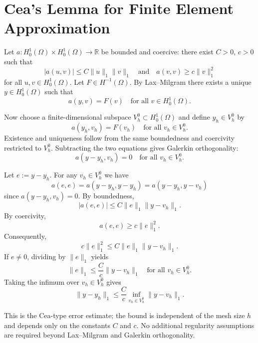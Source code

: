 \documentclass{article}
\begin{document}
\section*{Cea’s Lemma for Finite Element Approximation}

Let $a: H^1_0(\Omega) \times H^1_0(\Omega) \to \mathbb{R}$ be bounded and coercive: there exist $C>0$, $c>0$ such that
\[
|a(u,v)| \le C \|u\|_1 \|v\|_1
\quad \text{and} \quad
a(v,v) \ge c \|v\|_1^2
\]
for all $u,v \in H^1_0(\Omega)$. Let $F \in H^{-1}(\Omega)$. By Lax--Milgram there exists a unique $y \in H^1_0(\Omega)$ such that
\[
a(y,v) = F(v) \quad \text{for all } v \in H^1_0(\Omega).
\]

Now choose a finite-dimensional subspace $V_h^0 \subset H^1_0(\Omega)$ and define $y_h \in V_h^0$ by
\[
a(y_h,v_h) = F(v_h) \quad \text{for all } v_h \in V_h^0.
\]
Existence and uniqueness follow from the same boundedness and coercivity restricted to $V_h^0$. Subtracting the two equations gives Galerkin orthogonality:
\[
a(y - y_h, v_h) = 0 \quad \text{for all } v_h \in V_h^0.
\]

Let $e := y - y_h$. For any $v_h \in V_h^0$ we have
\[
a(e,e) = a(y - y_h, y - y_h) = a(y - y_h, y - v_h)
\]
since $a(y - y_h, v_h) = 0$. By boundedness,
\[
|a(e,e)| \le C \|e\|_1 \|y - v_h\|_1.
\]
By coercivity,
\[
a(e,e) \ge c \|e\|_1^2.
\]
Consequently,
\[
c \|e\|_1^2 \le C \|e\|_1 \|y - v_h\|_1.
\]
If $e \neq 0$, dividing by $\|e\|_1$ yields
\[
\|e\|_1 \le \frac{C}{c}\|y - v_h\|_1
\quad \text{for all } v_h \in V_h^0.
\]
Taking the infimum over $v_h \in V_h^0$ gives
\[
\|y - y_h\|_1 \le \frac{C}{c}\inf_{v_h \in V_h^0} \|y - v_h\|_1.
\]

This is the Cea-type error estimate; the bound is independent of the mesh size $h$ and depends only on the constants $C$ and $c$. No additional regularity assumptions are required beyond Lax--Milgram and Galerkin orthogonality.
\end{document}
